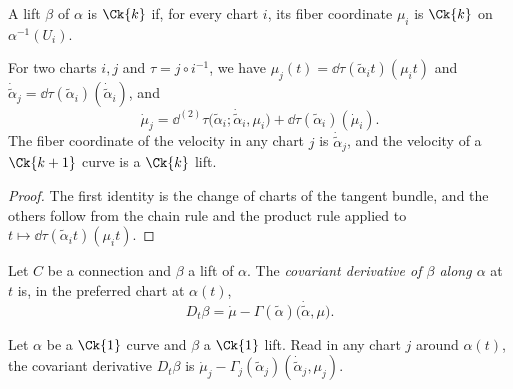 \begin{definition}
  \label{def:conn-lift}
  \leanok
  A lift $\beta$ of $\alpha$ is $\Ck{k}$ if, for every chart $i$, its fiber coordinate $\mu_i$ is
  $\Ck{k}$ on $\alpha^{-1}(U_i)$.
\end{definition}

\begin{lemma}
  \label{lem:conn-curve-transition}
  \leanok
  For two charts $i, j$ and $\tau = j \circ i^{-1}$, we have
  $\mu_j(t) = \dd\tau(\tilde\alpha_i t)(\mu_i t)$ and
  $\dot{\tilde\alpha}_j = \dd\tau(\tilde\alpha_i)(\dot{\tilde\alpha}_i)$, and
  \[
    \dot\mu_j = \dd^{(2)}\tau\bigl(\tilde\alpha_i; \dot{\tilde\alpha}_i, \mu_i\bigr)
      + \dd\tau(\tilde\alpha_i)(\dot\mu_i).
  \]
  The fiber coordinate of the velocity in any chart $j$ is $\dot{\tilde\alpha}_j$, and the
  velocity of a $\Ck{k+1}$ curve is a $\Ck{k}$ lift.
\end{lemma}

\begin{proof}
  \leanok
  The first identity is the change of charts of the tangent bundle, and the others follow from
  the chain rule and the product rule applied to $t \mapsto \dd\tau(\tilde\alpha_i t)(\mu_i t)$.
\end{proof}

\begin{definition}
  \label{def:cov-deriv-along}
  \leanok
  Let $C$ be a connection and $\beta$ a lift of $\alpha$. The \emph{covariant derivative of
  $\beta$ along $\alpha$} at $t$ is, in the preferred chart at $\alpha(t)$,
  \[
    D_t \beta = \dot\mu - \Gamma(\tilde\alpha)\bigl(\dot{\tilde\alpha}, \mu\bigr).
  \]
\end{definition}

\begin{theorem}
  \label{thm:conn-cov-deriv-along-chart}
  \leanok
  Let $\alpha$ be a $\Ck{1}$ curve and $\beta$ a $\Ck{1}$ lift. Read in any chart $j$ around
  $\alpha(t)$, the covariant derivative $D_t\beta$ is
  $\dot\mu_j - \Gamma_j(\tilde\alpha_j)(\dot{\tilde\alpha}_j, \mu_j)$.
\end{theorem}

